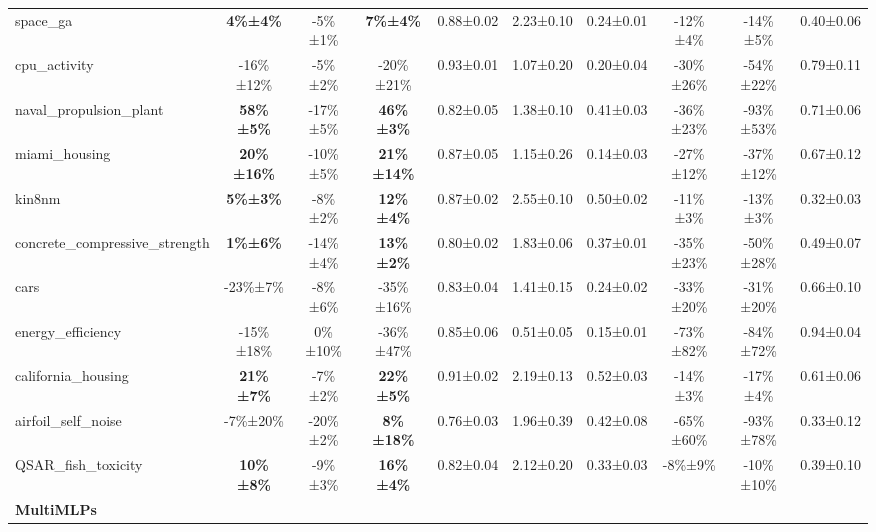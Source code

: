 \begin{table}[!htbp]
\begin{small}
\begin{sc}
{\begin{tabular}{lccccccccc}
space\_ga & \textbf{4\%±4\%} & -5\%±1\% & \textbf{7\%±4\%} & 0.88±0.02 & 2.23±0.10 & 0.24±0.01 & -12\%±4\% & -14\%±5\% & 0.40±0.06 \\
cpu\_activity & -16\%±12\% & -5\%±2\% & -20\%±21\% & 0.93±0.01 & 1.07±0.20 & 0.20±0.04 & -30\%±26\% & -54\%±22\% & 0.79±0.11 \\
naval\_propulsion\_plant & \textbf{58\%±5\%} & -17\%±5\% & \textbf{46\%±3\%} & 0.82±0.05 & 1.38±0.10 & 0.41±0.03 & -36\%±23\% & -93\%±53\% & 0.71±0.06 \\
miami\_housing & \textbf{20\%±16\%} & -10\%±5\% & \textbf{21\%±14\%} & 0.87±0.05 & 1.15±0.26 & 0.14±0.03 & -27\%±12\% & -37\%±12\% & 0.67±0.12 \\
kin8nm & \textbf{5\%±3\%} & -8\%±2\% & \textbf{12\%±4\%} & 0.87±0.02 & 2.55±0.10 & 0.50±0.02 & -11\%±3\% & -13\%±3\% & 0.32±0.03 \\
concrete\_compressive\_strength & \textbf{1\%±6\%} & -14\%±4\% & \textbf{13\%±2\%} & 0.80±0.02 & 1.83±0.06 & 0.37±0.01 & -35\%±23\% & -50\%±28\% & 0.49±0.07 \\
cars & -23\%±7\% & -8\%±6\% & -35\%±16\% & 0.83±0.04 & 1.41±0.15 & 0.24±0.02 & -33\%±20\% & -31\%±20\% & 0.66±0.10 \\
energy\_efficiency & -15\%±18\% & 0\%±10\% & -36\%±47\% & 0.85±0.06 & 0.51±0.05 & 0.15±0.01 & -73\%±82\% & -84\%±72\% & 0.94±0.04 \\
california\_housing & \textbf{21\%±7\%} & -7\%±2\% & \textbf{22\%±5\%} & 0.91±0.02 & 2.19±0.13 & 0.52±0.03 & -14\%±3\% & -17\%±4\% & 0.61±0.06 \\
airfoil\_self\_noise & -7\%±20\% & -20\%±2\% & \textbf{8\%±18\%} & 0.76±0.03 & 1.96±0.39 & 0.42±0.08 & -65\%±60\% & -93\%±78\% & 0.33±0.12 \\
QSAR\_fish\_toxicity & \textbf{10\%±8\%} & -9\%±3\% & \textbf{16\%±4\%} & 0.82±0.04 & 2.12±0.20 & 0.33±0.03 & -8\%±9\% & -10\%±10\% & 0.39±0.10 \\
\cmidrule(lr){1-10}
\textbf{MultiMLPs} & & & & & & & & & \\ \cmidrule(lr){1-10}


\end{tabular}}
\end{sc}
\end{small}
\end{table}
